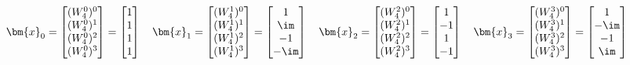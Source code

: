 \begin{align}
\bm{x}_0 =
\begin{bmatrix}
(W_4^0)^0\\
(W_4^0)^1\\
(W_4^0)^2\\
(W_4^0)^3
\end{bmatrix}
=
\begin{bmatrix}
1\\1\\1\\1
\end{bmatrix}
\quad
\bm{x}_1 =
\begin{bmatrix}
(W_4^1)^0\\
(W_4^1)^1\\
(W_4^1)^2\\
(W_4^1)^3
\end{bmatrix}
=
\begin{bmatrix}
1\\\im\\-1\\-\im
\end{bmatrix}\quad
\bm{x}_2 =
\begin{bmatrix}
(W_4^2)^0\\
(W_4^2)^1\\
(W_4^2)^2\\
(W_4^2)^3
\end{bmatrix}
=
\begin{bmatrix}
1\\-1\\1\\-1
\end{bmatrix}\quad
\bm{x}_3 =
\begin{bmatrix}
(W_4^3)^0\\
(W_4^3)^1\\
(W_4^3)^2\\
(W_4^3)^3
\end{bmatrix}
=
\begin{bmatrix}
1\\-\im\\-1\\\im
\end{bmatrix}
\end{align}
%


